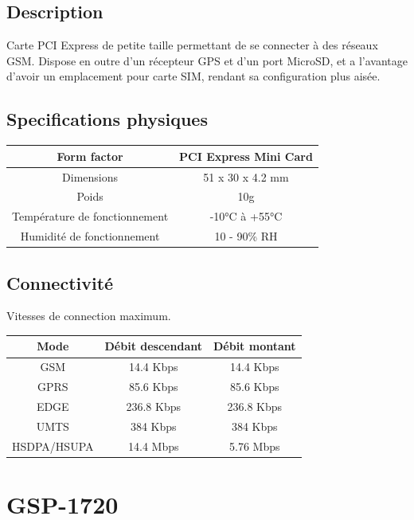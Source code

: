 \subsection{Description}

Carte PCI Express de petite taille permettant de se connecter à des réseaux GSM. Dispose en outre d'un récepteur GPS et d'un port MicroSD, et a l'avantage d'avoir un emplacement pour carte SIM, rendant sa configuration plus aisée.

\subsection{Specifications physiques}

\begin{tabular}{|c|c|}
\hline Form factor & PCI Express Mini Card \\ 
\hline Dimensions & 51 x 30 x 4.2 mm \\ 
\hline Poids & 10g \\
\hline Température de fonctionnement & -10°C à +55°C \\
\hline Humidité de fonctionnement & 10 - 90\% RH \\
\hline
\end{tabular} 

\subsection{Connectivité}

Vitesses de connection maximum.

\begin{tabular}{|c|c|c|}
\hline Mode & Débit descendant & Débit montant \\
\hline GSM & 14.4 Kbps & 14.4 Kbps \\
\hline GPRS & 85.6 Kbps & 85.6 Kbps \\
\hline EDGE & 236.8 Kbps & 236.8 Kbps \\
\hline UMTS & 384 Kbps & 384 Kbps \\
\hline HSDPA/HSUPA & 14.4 Mbps & 5.76 Mbps \\
\hline
\end{tabular}

\newpage
\section{GSP-1720}

